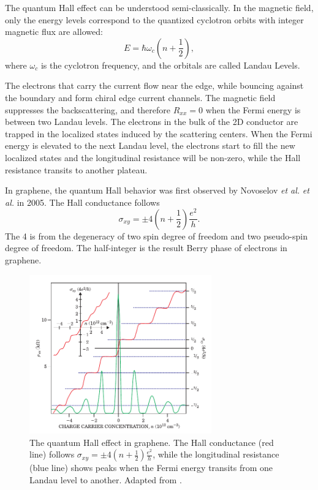 \documentclass[pdflatex, sectionletters, 12pt]{pittetd}    %
\begin{document}
The quantum Hall effect can be understood semi-classically. In the magnetic field, only the energy levels correspond to the quantized cyclotron orbits with integer magnetic flux are allowed:
$$E = \hbar\omega_c \left(n + \frac{1}{2}\right),$$
where $\omega_c$ is the cyclotron frequency, and the orbitals are called Landau Levels.

The electrons that carry the current flow near the edge, while bouncing against the boundary and form chiral edge current channels. The magnetic field suppresses the backscattering, and therefore $R_{xx} = 0$ when the Fermi energy is between two Landau levels. The electrons in the bulk of the 2D conductor are trapped in the localized states induced by the scattering centers. When the Fermi energy is elevated to the next Landau level, the electrons start to fill the new localized states and the longitudinal resistance will be non-zero, while the Hall resistance transits to another plateau.

In graphene, the quantum Hall behavior was first observed by Novoselov \textit{et al.} \cite{novoselov2005two} \textit{et al.}\cite{zhang2005experimental} in 2005. The Hall conductance follows
$$
\sigma_{xy} = \pm 4\left(n + \frac{1}{2}\right)\frac{e^2}{h}.
$$
The 4 is from the degeneracy of two spin degree of freedom and two pseudo-spin degree of freedom. The half-integer is the result Berry phase of electrons\cite{zhang2005experimental} in graphene.

\begin{figure}[p]
	\centering
	\includegraphics[width=0.7\textwidth]{Drawing/GrapheneQuantumHall.pdf}
	\caption{The quantum Hall effect in graphene. The Hall conductance (red line) follows $\displaystyle \sigma_{xy} = \pm4\left(n + \frac{1}{2}\right)\frac{e^2}{h}$, while the longitudinal resistance (blue line) shows peaks when the Fermi energy transits from one Landau level to another. Adapted from \cite{novoselov2005two}.}
	\label{FIG:GrapheneQuantumHall}
\end{figure}
\end{document}
